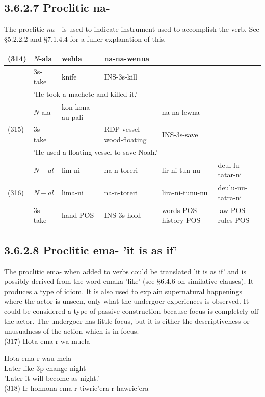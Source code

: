 \documentclass[10pt]{article}
\begin{document}
\subsection*{3.6.2.7 Proclitic na-}
The proclitic \(n a\) - is used to indicate instrument used to accomplish the verb. See §5.2.2.2 and §7.1.4.4 for a fuller explanation of this.

\begin{center}
\begin{tabular}{|l|l|l|l|l|l|}
\hline
\multirow[t]{3}{*}{(314)} & \(N\)-ala & wehla & na-na-wenna &  &  \\
\hline
 & 3s-take & knife & INS-3s-kill &  &  \\
\hline
 & \multicolumn{4}{|l|}{'He took a machete and killed it.'} &  \\
\hline
\multirow[t]{3}{*}{(315)} & \(N\)-ala & kon-kona-au-pali &  & na-na-lewna &  \\
\hline
 & 3s-take &  & RDP-vessel-wood-floating & INS-3s-save &  \\
\hline
 & \multicolumn{5}{|l|}{'He used a floating vessel to save Noah.'} \\
\hline
\multirow[t]{3}{*}{(316)} & \(N-a l\) & lim-ni & na-n-toreri & lir-ni-tun-nu & deul-lu-tatar-ni \\
\hline
 & \(N-a l\) & lima-ni & na-n-toreri & lira-ni-tunu-nu & deulu-nu-tatra-ni \\
\hline
 & 3s-take & hand-POS & INS-3s-hold & words-POS-history-POS & law-POS-rules-POS \\
\hline
\end{tabular}
\end{center}

\subsection*{3.6.2.8 Proclitic ema- 'it is as if'}
The proclitic ema- when added to verbs could be translated 'it is as if' and is possibly derived from the word emaka 'like' (see §6.4.6 on similative clauses). It produces a type of idiom. It is also used to explain supernatural happenings where the actor is unseen, only what the undergoer experiences is observed. It could be considered a type of passive construction because focus is completely off the actor. The undergoer has little focus, but it is either the descriptiveness or unusualness of the action which is in focus.\\
(317) Hota ema-r-wa-muela

Hota ema-r-wau-mela\\
Later like-3p-change-night\\
'Later it will become as night.'\\
(318) Ir-honnona ema-r-tiwrie'era-r-hawrie'era
\end{document}
